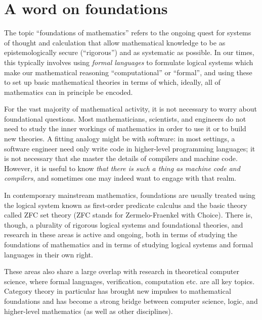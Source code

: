 
\section{A word on foundations}\label{sec:foundations}


The topic ``foundations of mathematics'' refers to the ongoing quest for systems of thought and calculation that allow mathematical knowledge to be as epistemologically secure (``rigorous'') and as systematic as possible.
In our times, this typically involves using \emph{formal languages} to formulate logical systems which make our mathematical reasoning ``computational'' or ``formal'', and using these to set up basic mathematical theories in terms of which, ideally, all of mathematics can in principle be encoded.

For the vast majority of mathematical activity, it is not necessary to worry about foundational questions.
Most mathematicians, scientists, and engineers do not need to study the inner workings of mathematics in order to use it or to build new theories.
A fitting analogy might be with software: in most settings, a software engineer need only write code in higher-level programming languages; it is not necessary that she master the details of compilers and machine code.
However, it is useful to know \emph{that there is such a thing as machine code and compilers}, and sometimes one may indeed want to engage with that realm.

In contemporary mainstream mathematics, foundations are usually treated using the logical system known as first-order predicate calculus and the basic theory called ZFC set theory (ZFC stands for Zermelo-Fraenkel with Choice).
There is, though, a plurality of rigorous logical systems and foundational theories, and research in these areas is active and ongoing, both in terms of studying the foundations of mathematics and in terms of studying logical systems and formal languages in their own right.

These areas also share a large overlap with research in theoretical computer science, where formal languages, verification, computation etc. are all key topics.
Category theory in particular has brought new impulses to mathematical foundations and has become a strong bridge between computer science, logic, and higher-level mathematics (as well as other disciplines).

